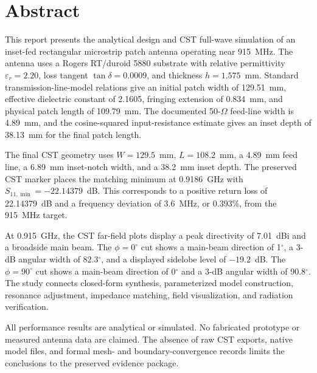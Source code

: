 \chapter*{Abstract}
\thispagestyle{fancy}
\begingroup
\setlength{\emergencystretch}{2em}

This report presents the analytical design and CST full-wave simulation of an
inset-fed rectangular microstrip patch antenna operating near 915~MHz. The antenna
uses a Rogers RT/duroid 5880 substrate with relative permittivity
$\varepsilon_r=2.20$, loss tangent $\tan\delta=0.0009$, and thickness
$h=1.575$~mm. Standard transmission-line-model relations give an initial patch width
of 129.51~mm, effective dielectric constant of 2.1605, fringing extension of
0.834~mm, and physical patch length of 109.79~mm. The documented 50-$\Omega$
feed-line width is 4.89~mm, and the cosine-squared input-resistance estimate gives an
inset depth of 38.13~mm for the final patch length.

The final CST geometry uses $W=129.5$~mm, $L=108.2$~mm, a 4.89~mm feed line,
a 6.89~mm inset-notch width, and a 38.2~mm inset depth. The preserved CST marker
places the matching minimum at 0.9186~GHz with
$S_{11,\min}=-22.14379$~dB. This corresponds to a positive return loss of
22.14379~dB and a frequency deviation of 3.6~MHz, or 0.393\%, from the 915~MHz
target.

At 0.915~GHz, the CST far-field plots display a peak directivity of 7.01~dBi and a
broadside main beam. The $\phi=0^\circ$ cut shows a main-beam direction of
1$^\circ$, a 3-dB angular width of 82.3$^\circ$, and a displayed sidelobe level of
$-19.2$~dB. The $\phi=90^\circ$ cut shows a main-beam direction of 0$^\circ$ and
a 3-dB angular width of 90.8$^\circ$. The study connects closed-form synthesis,
parameterized model construction, resonance adjustment, impedance matching, field
visualization, and radiation verification.

All performance results are analytical or simulated. No fabricated prototype or
measured antenna data are claimed. The absence of raw CST exports, native model files,
and formal mesh- and boundary-convergence records limits the conclusions to the
preserved evidence package.
\par\endgroup
